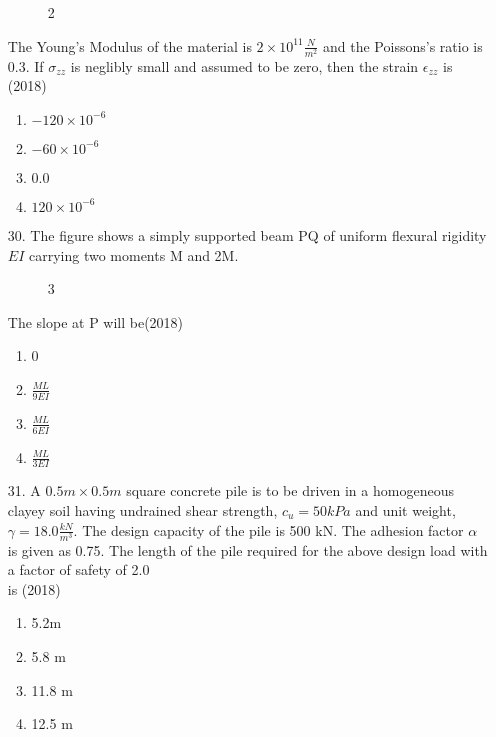 \documentclass[journal]{IEEEtran}
\begin{document}
\begin{enumerate}
    \begin{figure}[!ht]
        \centering
        \caption{2}
    \end{figure}
    The Young's Modulus of the material is $2\times 10^{11}\frac{N}{m^2}$ and the Poissons's ratio is 0.3. If $\sigma_{zz}$ is neglibly small and assumed to be zero, then the strain $\epsilon_{zz}$ is \hfill (2018)
    \begin{enumerate}[label=(\Alph*)]
        \item $-120\times 10^{-6}$
        \item $-60\times 10^{-6}$
        \item $0.0$
        \item $120\times 10^{-6}$
    \end{enumerate}
    \item[30.] The figure shows a simply supported beam PQ of uniform flexural rigidity $EI$ carrying two
    moments M and 2M. 
    \begin{figure}[!ht]
        \centering
        \caption{3}
    \end{figure}
    The slope at P will be\hfill (2018)
    \begin{enumerate}[label= (\Alph*)]
        \item 0
        \item $\frac{ML}{9EI}$
        \item $\frac{ML}{6EI}$
        \item $\frac{ML}{3EI}$
    \end{enumerate}
    \item[31.] A $0.5 m \times 0.5 m$ square concrete pile is to be driven in a homogeneous clayey soil having
    undrained shear strength, $c_u = 50 kPa$ and unit weight, $\gamma = 18.0 \frac{kN}{m^3}$. The design capacity
    of the pile is 500 kN. The adhesion factor $\alpha$ is given as 0.75. The length of the pile required
    for the above design load with a factor of safety of 2.0\\ is \hfill (2018)
    \begin{enumerate}[label = (\Alph*)]
        \item 5.2m 
        \item 5.8 m 
        \item 11.8 m
        \item 12.5 m 
    \end{enumerate}

\end{enumerate}
\end{document}
